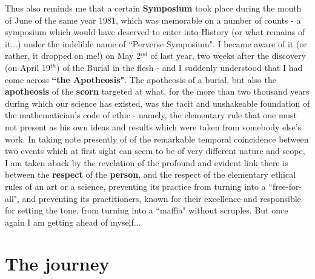 Thus also reminds me that a certain \textbf{Symposium} took place during the month of June of the same year 1981, which was memorable on a number of counts - a symposium which would have deserved to enter into History (or what remains of it...) under the indelible name of ``Perverse Symposium". I became aware of it (or rather, it dropped on me!) on May 2$^{nd}$ of last year, two weeks after the discovery (on April 19$^{th}$) of the Burial in the flesh - and I suddenly understood that I had come across \textbf{``the Apotheosis"}. The apotheosis of a burial, but also the \textbf{apotheosis} of the \textbf{scorn} targeted at what, for the more than two thousand years during which our science has existed, was the tacit and unshakeable foundation of the mathematician's code of ethic - namely, the elementary rule that one must not present as his own ideas and results which were taken from somebody else's work. In taking note presently of of the remarkable temporal coincidence between two events which at first sight can seem to be of very different nature and scope, I am taken aback by the revelation of the profound and evident link there is between the \textbf{respect} of the \textbf{person}, and the respect of the elementary ethical rules of an art or a science, preventing its practice from turning into a ``free-for-all", and preventing its practitioners, known for their excellence and responsible for setting the tone, from turning into a ``maffia" without scruples. But once again I am getting ahead of myself...

\section{The journey}

